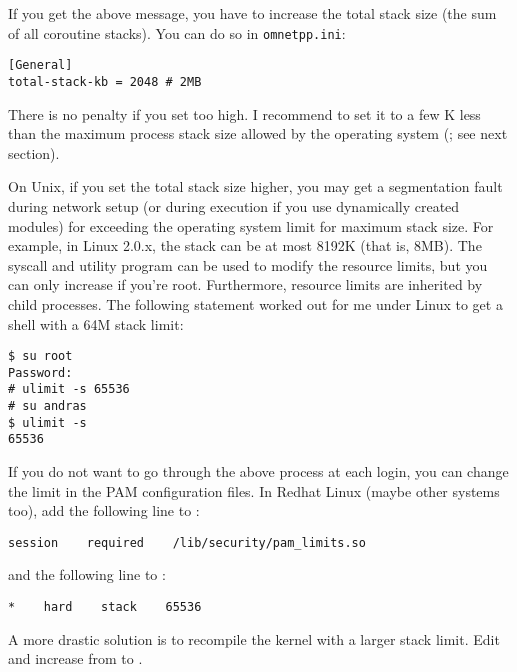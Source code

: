 If you get the above message, you have to increase the total stack
size (the sum of all coroutine stacks). You can do
so in \texttt{omnetpp.ini}:

\begin{verbatim}
[General]
total-stack-kb = 2048 # 2MB
\end{verbatim}


There is no penalty if you set  too high. I
recommend to set it to a few K less than the maximum process stack
size allowed by the operating system (; see
next section).




On Unix, if you set the total stack size higher, you may get a
segmentation fault during network setup (or
during execution if you use dynamically created modules) for exceeding
the operating system limit for maximum stack size. For example, in
Linux 2.0.x, the stack can be at most 8192K (that is, 8MB). The
 syscall and utility program can be used to modify the
resource limits, but you can only increase if you're root.
Furthermore, resource limits are inherited by child processes. The
following statement worked out for me under Linux to get a shell with
a 64M stack limit:

\begin{verbatim}
$ su root
Password:
# ulimit -s 65536
# su andras
$ ulimit -s
65536
\end{verbatim}

If you do not want to go through the above process at each login, you
can change the limit in the PAM configuration files. In Redhat Linux
(maybe other systems too), add the following line to
:

\begin{verbatim}
session    required    /lib/security/pam_limits.so
\end{verbatim}

and the following line to :

\begin{verbatim}
*    hard    stack    65536
\end{verbatim}

\begin{sloppypar}
A more drastic solution is to recompile the kernel with a larger stack
limit. Edit  and increase
 from  to .
\end{sloppypar}

